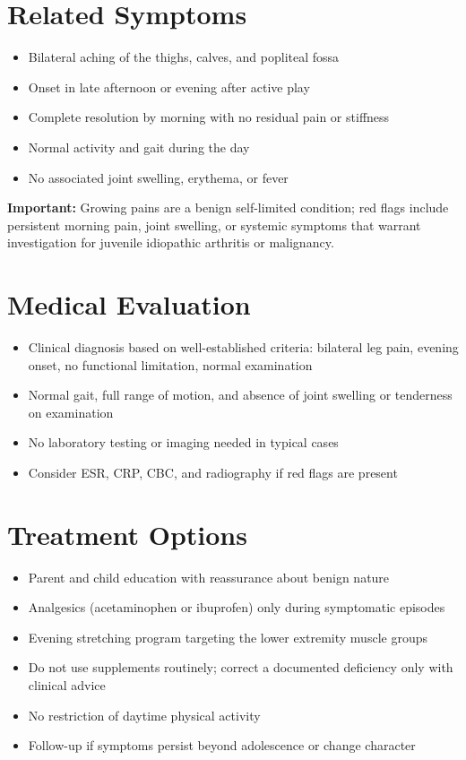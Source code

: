 \section*{Related Symptoms}
\begin{itemize}
  \item Bilateral aching of the thighs, calves, and popliteal fossa
  \item Onset in late afternoon or evening after active play
  \item Complete resolution by morning with no residual pain or stiffness
  \item Normal activity and gait during the day
  \item No associated joint swelling, erythema, or fever
\end{itemize}
\textbf{Important:} Growing pains are a benign self-limited condition; red flags include persistent morning pain, joint swelling, or systemic symptoms that warrant investigation for juvenile idiopathic arthritis or malignancy.

\section*{Medical Evaluation}
\begin{itemize}
  \item Clinical diagnosis based on well-established criteria: bilateral leg pain, evening onset, no functional limitation, normal examination
  \item Normal gait, full range of motion, and absence of joint swelling or tenderness on examination
  \item No laboratory testing or imaging needed in typical cases
  \item Consider ESR, CRP, CBC, and radiography if red flags are present
\end{itemize}

\section*{Treatment Options}
\begin{itemize}
  \item Parent and child education with reassurance about benign nature
  \item Analgesics (acetaminophen or ibuprofen) only during symptomatic episodes
  \item Evening stretching program targeting the lower extremity muscle groups
  \item Do not use supplements routinely; correct a documented deficiency only with clinical advice
  \item No restriction of daytime physical activity
  \item Follow-up if symptoms persist beyond adolescence or change character
\end{itemize}

